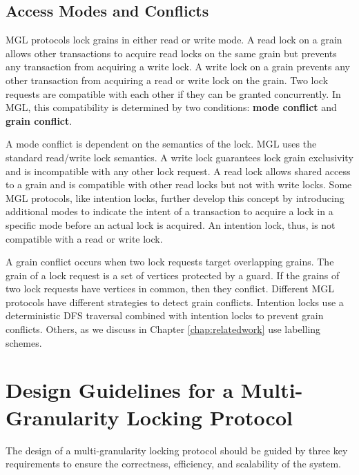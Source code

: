 \subsection{Access Modes and Conflicts}

MGL protocols lock grains in either read or write mode. A read lock on a grain allows other transactions to acquire read locks on the same grain but prevents any transaction from acquiring a write lock. A write lock on a grain prevents any other transaction from acquiring a read or write lock on the grain.
Two lock requests are compatible with each other if they can be granted concurrently. In MGL, this compatibility is determined by two conditions: \textbf{mode conflict} and \textbf{grain conflict}. 

A mode conflict is dependent on the semantics of the lock. MGL uses the standard read/write lock semantics. A write lock guarantees lock grain exclusivity and is incompatible with any other lock request. A read lock allows shared access to a grain and is compatible with other read locks but not with write locks. Some MGL protocols, like intention locks, further develop this concept by introducing additional modes to indicate the intent of a transaction to acquire a lock in a specific mode before an actual lock is acquired. An intention lock, thus, is not compatible with a read or write lock. 

A grain conflict occurs when two lock requests target overlapping grains. The grain of a lock request is a set of vertices protected by a guard. If the grains of two lock requests have vertices in common, then they conflict. Different MGL protocols have different strategies to detect grain conflicts. Intention locks use a deterministic DFS traversal combined with intention locks to prevent grain conflicts. Others, as we discuss in Chapter \ref{chap:relatedwork} use labelling schemes.

\section{Design Guidelines for a Multi-Granularity Locking Protocol} \label{sec:requirements}

The design of a multi-granularity locking protocol should be guided by three key requirements to ensure the correctness, efficiency, and scalability of the system.

